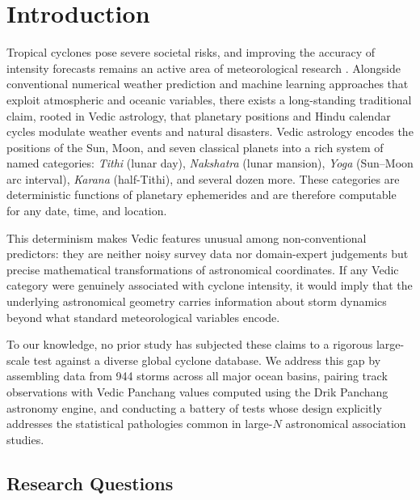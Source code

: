 \documentclass[12pt,a4paper]{article}
\begin{document}
\tableofcontents
\clearpage

\section{Introduction}
\label{sec:intro}

Tropical cyclones pose severe societal risks, and improving the accuracy of
intensity forecasts remains an active area of meteorological research
\citep{emanuel2003tropical}.
Alongside conventional numerical weather prediction and machine learning
approaches that exploit atmospheric and oceanic variables, there exists a
long-standing traditional claim, rooted in Vedic astrology, that planetary
positions and Hindu calendar cycles modulate weather events and natural
disasters.
Vedic astrology encodes the positions of the Sun, Moon, and seven classical
planets into a rich system of named categories: \textit{Tithi} (lunar day),
\textit{Nakshatra} (lunar mansion), \textit{Yoga} (Sun--Moon arc interval),
\textit{Karana} (half-Tithi), and several dozen more.
These categories are deterministic functions of planetary ephemerides and are
therefore computable for any date, time, and location.

This determinism makes Vedic features unusual among non-conventional predictors:
they are neither noisy survey data nor domain-expert judgements but precise
mathematical transformations of astronomical coordinates.
If any Vedic category were genuinely associated with cyclone intensity, it would
imply that the underlying astronomical geometry carries information about storm
dynamics beyond what standard meteorological variables encode.

To our knowledge, no prior study has subjected these claims to a rigorous
large-scale test against a diverse global cyclone database.
We address this gap by assembling data from 944 storms across all major ocean
basins, pairing track observations with Vedic Panchang values computed using the
Drik Panchang astronomy engine, and conducting a battery of tests whose design
explicitly addresses the statistical pathologies common in large-$N$ astronomical
association studies.

\subsection*{Research Questions}
\end{document}
